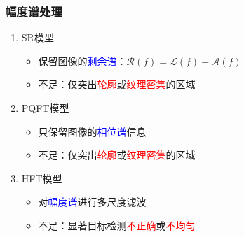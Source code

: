 \documentclass[notheorems,mathserif,table,compress]{beamer}  %
\begin{document}


\begin{frame}
  \frametitle{幅度谱处理 }
  \begin{enumerate}
  \item \textrm{SR}模型 
  \begin{itemize}
  \item 保留图像的\textcolor{blue}{剩余谱}：$\mathcal{R}(f)=\mathcal{L}(f)-\mathcal{A}(f)$
  \item 不足：仅突出\textcolor{red}{轮廓}或\textcolor{red}{纹理密集}的区域
  \end{itemize}
\pause
  \item \textrm{PQFT}模型
  \begin{itemize}
  \item 只保留图像的\textcolor{blue}{相位谱}信息
  \item 不足：仅突出\textcolor{red}{轮廓}或\textcolor{red}{纹理密集}的区域
  \end{itemize}
\pause
  \item \textrm{HFT}模型
  \begin{itemize}
  \item 对\textcolor{blue}{幅度谱}进行多尺度滤波
  \item 不足：显著目标检测\textcolor{red}{不正确}或\textcolor{red}{不均匀}
  \end{itemize}
  \end{enumerate}
\end{frame}
\end{document}
